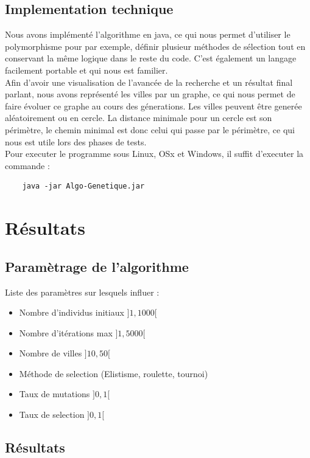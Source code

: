 \documentclass{article}
\begin{document}
	\subsection{Implementation technique}
	Nous avons implémenté l'algorithme en java, ce qui nous permet d'utiliser le polymorphisme pour par exemple, définir plusieur méthodes de sélection tout en conservant la même logique dans le reste du code. C'est également un langage facilement portable et qui nous est familier.
    \\
    Afin d'avoir une visualisation de l'avancée de la recherche et un résultat final parlant, nous avons représenté les villes par un graphe, ce qui nous permet de faire évoluer ce graphe au cours des génerations. Les villes peuvent être generée aléatoirement ou en cercle. La distance minimale pour un cercle est son périmètre, le chemin minimal est donc celui qui passe par le périmètre, ce qui nous est utile lors des phases de tests.
    \\
    Pour executer le programme sous Linux, OSx et Windows, il suffit d'executer la commande :

    \begin{verbatim}
    java -jar Algo-Genetique.jar
    \end{verbatim}

\section{Résultats}
	\subsection{Paramètrage de l'algorithme}

	Liste des paramètres sur lesquels influer :
	\begin{itemize}
	\item Nombre d'individus initiaux $]1,1000[$
	\item Nombre d'itérations max $]1,5000[$
	\item Nombre de villes $]10,50[$
	\item Méthode de selection (Elistisme, roulette, tournoi)
	\item Taux de mutations $]0,1[$
	\item Taux de selection $]0,1[$
	\end{itemize}

	\subsection{Résultats}
\end{document}
